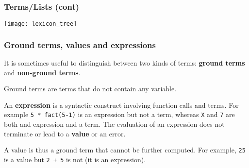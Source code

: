 %
\begin{frame}
\frametitle{Terms/Lists (cont)}

\begin{center}
\texttt{[image: lexicon\_tree]}
\end{center}

\end{frame}

%
\begin{frame}
\frametitle{Ground terms, values and expressions}

It is sometimes useful to distinguish between two kinds of terms:
\textbf{ground terms} and \textbf{non-ground terms}.

\bigskip

Ground terms are terms that do not contain any variable. 

\bigskip

An \textbf{expression} is a syntactic construct involving function
calls and terms. For example \texttt{\small 5 * fact(5-1)} is an
expression but not a term, whereas \texttt{\small X} and
\texttt{\small 7} are both and expression and a term. The evaluation
of an expression does not terminate or lead to a \textbf{value} or an
error.

\bigskip

A value is thus a ground term that cannot be further computed. For
example, \texttt{25} is a value but \texttt{2 + 5} is not (it is an
expression).

\end{frame}
